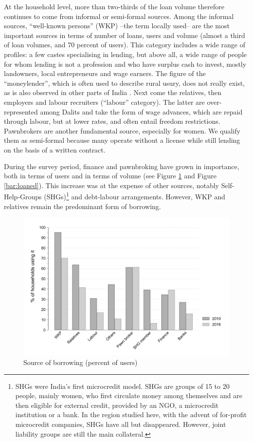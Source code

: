 \documentclass[a4paper, 11pt, onecolumn]{article}
\begin{document}
At the household level, more than two-thirds of the loan volume therefore continues to come from informal or semi-formal sources. 
Among the informal sources, ``well-known persons'' (WKP) --the term locally used-- are the most important sources in terms of number of loans, users and volume (almost a third of loan volumes, and 70 percent of users). 
This category includes a wide range of profiles: a few castes specialising in lending, but above all, a wide range of people for whom lending is not a profession and who have surplus cash to invest, mostly landowners, local entrepreneurs and wage earners. 
The figure of the ``moneylender'', which is often used to describe rural usury, does not really exist, as is also observed in other parts of India \citep{Gregory1997}. 
Next come the relatives, then employers and labour recruiters (``labour'' category). 
The latter are over-represented among Dalits and take the form of wage advances, which are repaid through labour, but at lower rates, and often entail freedom restrictions. 
Pawnbrokers are another fundamental source, especially for women. 
We qualify them as semi-formal because many operate without a license while still lending on the basis of a written contract. 

During the survey period, finance and pawnbroking have grown in importance, both in terms of users and in terms of volume (see Figure \ref{bar:clientele} and Figure \ref{bar:loaned}). 
This increase was at the expense of other sources, notably Self-Help-Groups (SHGs)\footnote{SHGs were India's first microcredit model. SHGs are groups of 15 to 20 people, mainly women, who first circulate money among themselves and are then eligible for external credit, provided by an NGO, a microcredit institution or a bank. In the region studied here, with the advent of for-profit microcredit companies, SHGs have all but disappeared. However, joint liability groups are still the main collateral.}  and debt-labour arrangements. 
However, WKP and relatives remain the predominant form of borrowing.

\begin{figure}[ht]
\center
\includegraphics[width=12cm]{totalclientele.png}
\caption{Source of borrowing (percent of users)}
\label{bar:clientele}
\end{figure}
\end{document}
